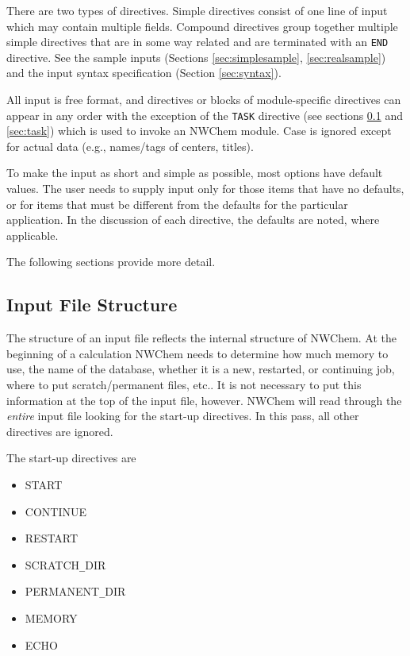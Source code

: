 There are two types of directives.  Simple directives consist of one
line of input which may contain multiple fields.  Compound directives
group together multiple simple directives that are in some way
related and are terminated with an \verb+END+ directive.  See the
sample inputs (Sections \ref{sec:simplesample}, \ref{sec:realsample})
and the input syntax specification (Section \ref{sec:syntax}).

All input is free format, and directives or blocks of module-specific
directives can appear in any order with the exception of the
\verb+TASK+ directive (see sections \ref{sec:inputstructure} and
\ref{sec:task}) which is used to invoke an NWChem module.  Case is
ignored except for actual data (e.g., names/tags of centers, titles).

To make the input as short and simple as possible, most options have
default values.  The user needs to supply input only for those items that
have no defaults, or for items that must be different from the defaults
for the particular application.  In the discussion of each directive, the
defaults are noted, where applicable.

The following sections provide more detail.

\subsection{Input File Structure}
\label{sec:inputstructure}

The structure of an input file reflects the internal structure of
NWChem.  At the beginning of a calculation NWChem needs to determine
how much memory to use, the name of the database, whether it is a new,
restarted, or continuing job, where to put scratch/permanent files,
etc..  It is not necessary to put this information at the top of the
input file, however.  NWChem will read through the {\em entire} input
file looking for the start-up directives.  In this pass, all other
directives are ignored.

The start-up directives are
\begin{itemize}
\item START
\item CONTINUE
\item RESTART
\item SCRATCH{\verb+_+}DIR
\item PERMANENT{\verb+_+}DIR
\item MEMORY
\item ECHO
\end{itemize}

